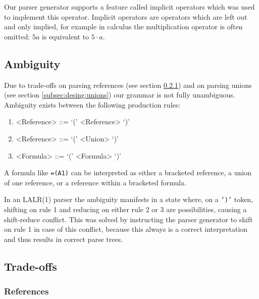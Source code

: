 \documentclass[conference]{IEEEtran}
\begin{document}
Our parser generator supports a feature called implicit operators which was used to implement this operator.
Implicit operators are operators which are left out and only implied, for example in calculus the multiplication operator is often omitted: $5a$ is equivalent to $5 \cdot a$.

\subsection{Ambiguity}
\label{sec:ambiguity}

Due to trade-offs on parsing references (see section \ref{tradeoff:references}) and on parsing unions (see section \ref{subsec:desing:unions}) our grammar is not fully unambiguous.
Ambiguity exists between the following production rules:
\begin{enumerate}
\item \begin{grammar}<Reference> ::= `(' <Reference> `)'\end{grammar}
\item \begin{grammar}<Reference> ::= `(' <Union> `)'\end{grammar}
\item \begin{grammar}<Formula> ::= `(' <Formula> `)'\end{grammar}
\end{enumerate}

A formula like \texttt{=(A1)} can be interpreted as either a bracketed reference, a union of one reference, or a reference within a bracketed formula.

In an LALR(1) parser the ambiguity manifests in a state where, on a \texttt{')'} token, shifting on rule 1 and reducing on either rule 2 or 3 are possibilities, causing a shift-reduce conflict.
This was solved by instructing the parser generator to shift on rule 1 in case of this conflict, because this always is a correct interpretation and thus results in correct parse trees.

\subsection{Trade-offs}

\subsubsection{\textbf{References}}
\label{tradeoff:references}
\end{document}
